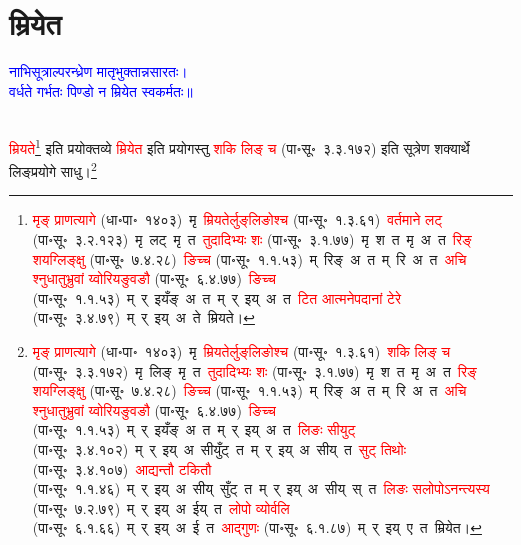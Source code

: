 \section[म्रियेत]{म्रियेत}
\centering\textcolor{blue}{नाभिसूत्राल्परन्ध्रेण मातृभुक्तान्नसारतः।\nopagebreak\\
वर्धते गर्भतः पिण्डो न म्रियेत स्वकर्मतः॥}\nopagebreak\\
\\
\fontsize{14}{21}\selectfont\begin{sloppypar}\justifying\noindent\hspace{10mm} \textcolor{red}{म्रियते}\footnote{\textcolor{red}{मृङ् प्राणत्यागे} (धा॰पा॰~१४०३)~\arrow मृ~\arrow \textcolor{red}{म्रियतेर्लुङ्‌लिङोश्च} (पा॰सू॰~१.३.६१)~\arrow \textcolor{red}{वर्तमाने लट्} (पा॰सू॰~३.२.१२३)~\arrow मृ~लट्~\arrow मृ~त~\arrow \textcolor{red}{तुदादिभ्यः शः} (पा॰सू॰~३.१.७७)~\arrow मृ~श~त~\arrow मृ~अ~त~\arrow \textcolor{red}{रिङ् शयग्लिङ्क्षु} (पा॰सू॰~७.४.२८)~\arrow \textcolor{red}{ङिच्च} (पा॰सू॰~१.१.५३)~\arrow म्~रिङ्~अ~त~\arrow म्~रि~अ~त~\arrow \textcolor{red}{अचि श्नुधातुभ्रुवां य्वोरियङुवङौ} (पा॰सू॰~६.४.७७)~\arrow \textcolor{red}{ङिच्च} (पा॰सू॰~१.१.५३)~\arrow म्~र्~इयँङ्~अ~त~\arrow म्~र्~इय्~अ~त~\arrow \textcolor{red}{टित आत्मनेपदानां टेरे} (पा॰सू॰~३.४.७९)~\arrow म्~र्~इय्~अ~ते~\arrow म्रियते।} इति प्रयोक्तव्ये \textcolor{red}{म्रियेत} इति प्रयोगस्तु \textcolor{red}{शकि लिङ् च} (पा॰सू॰~३.३.१७२) इति सूत्रेण शक्यार्थे लिङ्प्रयोगे साधु।\footnote{\textcolor{red}{मृङ् प्राणत्यागे} (धा॰पा॰~१४०३)~\arrow मृ~\arrow \textcolor{red}{म्रियतेर्लुङ्‌लिङोश्च} (पा॰सू॰~१.३.६१)~\arrow \textcolor{red}{शकि लिङ् च} (पा॰सू॰~३.३.१७२)~\arrow मृ~लिङ्~\arrow मृ~त~\arrow \textcolor{red}{तुदादिभ्यः शः} (पा॰सू॰~३.१.७७)~\arrow मृ~श~त~\arrow मृ~अ~त~\arrow \textcolor{red}{रिङ् शयग्लिङ्क्षु} (पा॰सू॰~७.४.२८)~\arrow \textcolor{red}{ङिच्च} (पा॰सू॰~१.१.५३)~\arrow म्~रिङ्~अ~त~\arrow म्~रि~अ~त~\arrow \textcolor{red}{अचि श्नुधातुभ्रुवां य्वोरियङुवङौ} (पा॰सू॰~६.४.७७)~\arrow \textcolor{red}{ङिच्च} (पा॰सू॰~१.१.५३)~\arrow म्~र्~इयँङ्~अ~त~\arrow म्~र्~इय्~अ~त~\arrow \textcolor{red}{लिङः सीयुट्} (पा॰सू॰~३.४.१०२)~\arrow म्~र्~इय्~अ~सीयुँट्~त~\arrow म्~र्~इय्~अ~सीय्~त~\arrow \textcolor{red}{सुट् तिथोः} (पा॰सू॰~३.४.१०७)~\arrow \textcolor{red}{आद्यन्तौ टकितौ} (पा॰सू॰~१.१.४६)~\arrow म्~र्~इय्~अ~सीय्~सुँट्~त~\arrow म्~र्~इय्~अ~सीय्~स्~त~\arrow \textcolor{red}{लिङः सलोपोऽनन्त्यस्य} (पा॰सू॰~७.२.७९)~\arrow म्~र्~इय्~अ~ईय्~त~\arrow \textcolor{red}{लोपो व्योर्वलि} (पा॰सू॰~६.१.६६)~\arrow म्~र्~इय्~अ~ई~त~\arrow \textcolor{red}{आद्गुणः} (पा॰सू॰~६.१.८७)~\arrow म्~र्~इय्~ए~त~\arrow म्रियेत।}\end{sloppypar}
